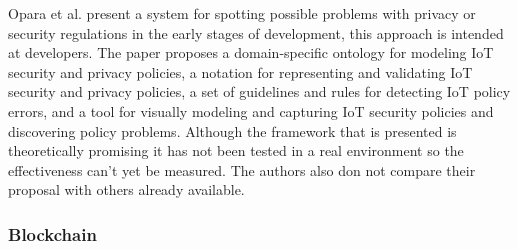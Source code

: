 \documentclass[conference]{IEEEtran}
\begin{document}
Opara et al. \cite{opara2022framework} present a system for spotting possible
problems with privacy or security regulations in the early stages of development,
this approach is intended at developers. The paper proposes a domain-specific
ontology for modeling IoT security and privacy policies, a notation for
representing and validating IoT security and privacy policies, a set of
guidelines and rules for detecting IoT policy errors, and a tool for visually
modeling and capturing IoT security policies and discovering policy problems.
Although the framework that is presented is theoretically promising it has
not been tested in a real environment so the effectiveness can't yet be measured.
The authors also don not compare their proposal with others already available.




\subsubsection{Blockchain}
\end{document}
